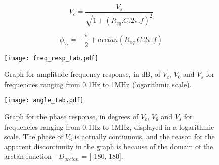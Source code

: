 \begin{equation}
  V_c = \frac{V_s}{\sqrt{1 + (R_{eq}.C.2\pi.f)^2}}
  \label{eq:freqresp1}
\end{equation}

\begin{equation}
  \phi_{V_c} = -\frac{\pi}{2} + arctan(R_{eq}.C.2\pi.f)
  \label{eq:freqresp2}
\end{equation}
\begin{figure}[H] \centering
\texttt{[image: freq\_resp\_tab.pdf]}
\vspace{10px}
\caption{Graph for amplitude frequency response, in dB, of $V_c$, $V_6$ and $V_s$ for frequencies ranging from 0.1Hz to 1MHz (logarithmic scale).}
\label{fig:freq_resp}
\end{figure}



\begin{figure}[H] \centering
\texttt{[image: angle\_tab.pdf]}
\vspace{10px}
\caption{Graph for the phase response, in degrees of $V_c$, $V_6$ and $V_s$ for frequencies ranging from 0.1Hz to 1MHz, displayed in a logarithmic scale. The phase of $V_6$ is actually continuous, and the reason for the apparent discontinuity in the graph is because of the domain of the arctan function - $D_{arctan}$ = ]-180, 180].}
\label{fig:angle_resp}
\end{figure}



